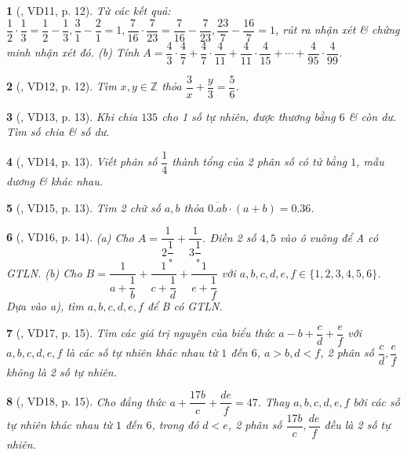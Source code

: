 \documentclass{article}
\newtheorem{baitoan}{}
\begin{document}
\begin{baitoan}[\cite{Binh_Toan_6_tap_2}, VD11, p. 12]
	Từ các kết quả: $\dfrac{1}{2}\cdot\dfrac{1}{3} = \dfrac{1}{2} - \dfrac{1}{3},\dfrac{3}{1} - \dfrac{2}{1} = 1,\dfrac{7}{16}\cdot\dfrac{7}{23} = \dfrac{7}{16} - \dfrac{7}{23},\dfrac{23}{7} - \dfrac{16}{7} = 1$, rút ra nhận xét \& chứng minh nhận xét đó. (b) Tính $A = \dfrac{4}{3}\cdot\dfrac{4}{7} + \dfrac{4}{7}\cdot\dfrac{4}{11} +  \dfrac{4}{11}\cdot\dfrac{4}{15} + \cdots + \dfrac{4}{95}\cdot\dfrac{4}{99}$.
\end{baitoan}

\begin{baitoan}[\cite{Binh_Toan_6_tap_2}, VD12, p. 12]
	Tìm $x,y\in\mathbb{Z}$ thỏa $\dfrac{3}{x} + \dfrac{y}{3} = \dfrac{5}{6}$.
\end{baitoan}

\begin{baitoan}[\cite{Binh_Toan_6_tap_2}, VD13, p. 13]
	Khi chia $135$ cho 1 số tự nhiên, được thương bằng $6$ \& còn dư. Tìm số chia \& số dư.
\end{baitoan}

\begin{baitoan}[\cite{Binh_Toan_6_tap_2}, VD14, p. 13]
	Viết phân số $\dfrac{1}{4}$ thành tổng của 2 phân số có tử bằng $1$, mẫu dương \& khác nhau.
\end{baitoan}

\begin{baitoan}[\cite{Binh_Toan_6_tap_2}, VD15, p. 13]
	Tìm 2 chữ số $a,b$ thỏa $\overline{0.ab}\cdot(a + b) = 0.36$.
\end{baitoan}

\begin{baitoan}[\cite{Binh_Toan_6_tap_2}, VD16, p. 14]
	(a) Cho $A = \dfrac{1}{2\dfrac{1}{\square}} + \dfrac{1}{3\dfrac{1}{\square}}$. Điền 2 số $4,5$ vào ô vuông để A có {\rm GTLN}. (b) Cho $B = \dfrac{1}{a + \dfrac{1}{b}} + \dfrac{1}{c + \dfrac{1}{d}} + \dfrac{1}{e + \dfrac{1}{f}}$ với $a,b,c,d,e,f\in\{1,2,3,4,5,6\}$. Dựa vào a), tìm $a,b,c,d,e,f$ để B có {\rm GTLN}.
\end{baitoan}

\begin{baitoan}[\cite{Binh_Toan_6_tap_2}, VD17, p. 15]
	Tìm các giá trị nguyên của biểu thức $a - b + \dfrac{c}{d} + \dfrac{e}{f}$ với $a,b,c,d,e,f$ là các số tự nhiên khác nhau từ $1$ đến $6$, $a > b,d < f$, 2 phân số $\dfrac{c}{d},\dfrac{e}{f}$ không là 2 số tự nhiên.
\end{baitoan}

\begin{baitoan}[\cite{Binh_Toan_6_tap_2}, VD18, p. 15]
	Cho đẳng thức $a + \dfrac{17b}{c} + \dfrac{de}{f} = 47$. Thay $a,b,c,d,e,f$ bởi các số tự nhiên khác nhau từ $1$ đến $6$, trong đó $d < e$, 2 phân số $\dfrac{17b}{c},\dfrac{de}{f}$ đều là 2 số tự nhiên.
\end{baitoan}
\end{document}

